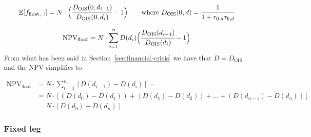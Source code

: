 \begin{equation*}
\mathbb{E}[f_{\mathrm{float},~i}] = N\cdot\Big(\cfrac{D_{\mathrm{OIS}}(0, d_{i-1})}{D_{\mathrm{OIS}}(0, d_{i})} - 1\Big)\qquad \mathrm{where}\ D_{\mathrm{OIS}}(0,d)=\cfrac{1}{1+r_{0,d}\tau_{0,d}}
\end{equation*}

\begin{equation*}
\mathrm{NPV}_{\mathrm{float}} = N\cdot \sum_{i=1}^{n}D(d_i) \Big(\cfrac{D_{\mathrm{OIS}}(d_{i-1})}{D_{\mathrm{OIS}}(d_{i})} - 1\Big)
\end{equation*}
From what has been said in Section~\ref{sec:financial-crisis} we have that $D = D_{\mathrm{OIS}}$ and the NPV simplifies to

\begin{equation}
	\begin{split}
		\mathrm{NPV}_{\mathrm{float}} & = N\cdot\sum_{i=1}^{n}[D(d_{i-1}) - D(d_i)] =  \\
		&= N\cdot[(D(d_{0}) - D(d_{1})) + (D(d_{1}) - D(d_{2})) + ... + (D(d_{n-1}) - D(d_{n}))]\\
		&= N \cdot [D(d_0) - D(d_n)]
	\end{split}
\end{equation}

%

\subsubsection{Fixed leg}\label{fixed-leg}

